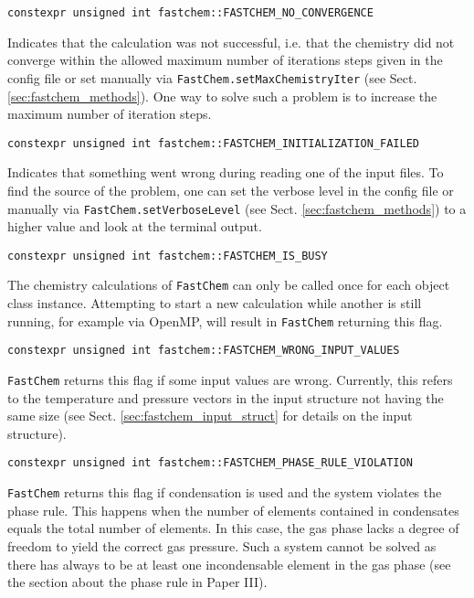 \documentclass[numbers=noenddot]{aux/fcmanual}
\newcommand{\fc}{\texttt{FastChem}\xspace}
\begin{document}
\bigbreak

\lstinline!constexpr unsigned int fastchem::FASTCHEM_NO_CONVERGENCE!
\begin{addmargin}[25pt]{0pt}
  Indicates that the calculation was not successful, i.e. that the chemistry did not converge within the allowed maximum number of iterations steps given in the config file or set manually via \lstinline!FastChem.setMaxChemistryIter! (see Sect. \ref{sec:fastchem_methods}). One way to solve such a problem is to increase the maximum number of iteration steps.
\end{addmargin}

\bigbreak

\lstinline!constexpr unsigned int fastchem::FASTCHEM_INITIALIZATION_FAILED!
\begin{addmargin}[25pt]{0pt}
  Indicates that something went wrong during reading one of the input files. To find the source of the problem, one can set the verbose level in the config file or manually via \lstinline!FastChem.setVerboseLevel! (see Sect. \ref{sec:fastchem_methods}) to a higher value and look at the terminal output.
\end{addmargin}

\bigbreak

\lstinline!constexpr unsigned int fastchem::FASTCHEM_IS_BUSY!
\begin{addmargin}[25pt]{0pt}
  The chemistry calculations of \fc can only be called once for each object class instance. Attempting to start a new calculation while another is still running, for example via OpenMP, will result in \fc returning this flag.
\end{addmargin}

\bigbreak

\lstinline!constexpr unsigned int fastchem::FASTCHEM_WRONG_INPUT_VALUES!
\begin{addmargin}[25pt]{0pt}
  \fc returns this flag if some input values are wrong. Currently, this refers to the temperature and pressure vectors in the input structure not having the same size (see Sect. \ref{sec:fastchem_input_struct} for details on the input structure). \\
\end{addmargin}

\bigbreak

\lstinline!constexpr unsigned int fastchem::FASTCHEM_PHASE_RULE_VIOLATION!
\begin{addmargin}[25pt]{0pt}
	\fc returns this flag if condensation is used and the system violates the phase rule. This happens when the number of elements contained in condensates equals the total number of elements. In this case, the gas phase lacks a degree of freedom to yield the correct gas pressure. Such a system cannot be solved as there has always to be at least one incondensable element in the gas phase (see the section about the phase rule in Paper III). \\
\end{addmargin}
\end{document}
